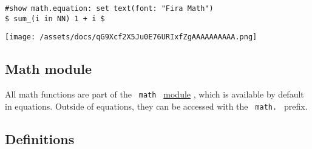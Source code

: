 \begin{verbatim}
#show math.equation: set text(font: "Fira Math")
$ sum_(i in NN) 1 + i $
\end{verbatim}

\texttt{[image: /assets/docs/qG9Xcf2X5Ju0E76URIxfZgAAAAAAAAAA.png]}

\subsection{Math module}\label{math-module}

All math functions are part of the \texttt{\ math\ }
\href{/docs/reference/scripting/\#modules}{module} , which is available
by default in equations. Outside of equations, they can be accessed with
the \texttt{\ math.\ } prefix.

\subsection{Definitions}\label{definitions}

